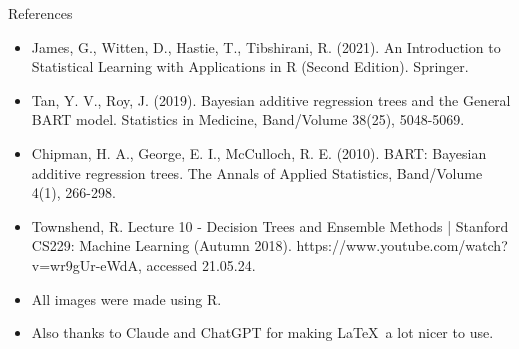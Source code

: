 \documentclass[10pt]{beamer}
\begin{document}
\begin{frame}{References}
    \begin{itemize}
        \item James, G., Witten, D., Hastie, T., Tibshirani, R. (2021). An Introduction to Statistical Learning with Applications in R (Second Edition). Springer.
        \item Tan, Y. V., Roy, J. (2019). Bayesian additive regression trees and the General BART model. Statistics in Medicine, Band/Volume 38(25), 5048-5069.
        \item Chipman, H. A., George, E. I., McCulloch, R. E. (2010). BART: Bayesian additive regression trees. The Annals of Applied Statistics, Band/Volume 4(1), 266-298.
        \item Townshend, R. Lecture 10 - Decision Trees and Ensemble Methods | Stanford CS229: Machine Learning (Autumn 2018). https://www.youtube.com/watch?v=wr9gUr-eWdA, accessed 21.05.24.
    \vspace{0.5cm}

        \item All images were made using R.
        \item Also thanks to Claude and ChatGPT for making \LaTeX\ a lot nicer to use.
    \end{itemize}
\end{frame}
\end{document}
